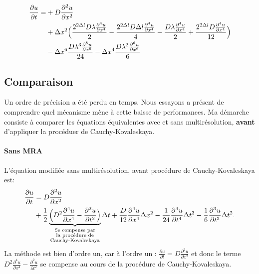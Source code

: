     \begin{align}
        \frac{\partial u}{\partial t}
        =&+ D \frac{\partial^{2}u}{\partial x^{2}}\\\notag
        &+ \Delta x^{2}\Bigl(\frac{2^{2 \Delta l} D  \lambda \frac{\partial^{4}u}{\partial x^{4}}}{2} 
        -  \frac{2^{2 \Delta l} D \Delta l \frac{\partial^{4}u}{\partial x^{4}}}{4} 
        -  \frac{D \lambda \frac{\partial^{4}u}{\partial x^{4}}}{2} 
        +  \frac{2^{2 \Delta l} D\frac{\partial^{4}u}{\partial x^{4}}}{12}\Bigr)\\\notag
        &- \Delta x^{6} \frac{D \lambda^{3} \frac{\partial^{8}u}{\partial x^{8}}}{24} 
        - \Delta x^{4} \frac{D \lambda^{2} \frac{\partial^{6}u}{\partial x^{6}}}{6} 
    \end{align}
\subsection{Comparaison}
    Un ordre de précision a été perdu en temps. Nous essayons a présent de comprendre quel mécanisme mène à cette baisse de performances.
    Ma démarche consiste à comparer les équations équivalentes avec et sans multirésolution, \textbf{avant} d'appliquer la procéduer de Cauchy-Kovaleskaya.
    \paragraph{Sans MRA}
        L'équation modifiée sans multirésolution, avant procédure de Cauchy-Kovaleskaya est:
        \begin{align}
            \frac{\partial u}{\partial t}  &= D \frac{\partial^{2} u}{\partial x^{2}} \\\notag
                &+ \frac{1}{2} \underbrace{\Bigl(D^{2}\frac{\partial^{4} u}{\partial x^{4}} - \frac{\partial^{2} u}{\partial t^{2}} \Bigr)}_{\substack{\text{Se compense par} \\ \text{la procédure de} \\ \text{Cauchy-Kovaleskaya}}} \Delta t
                + \frac{D}{12} \frac{\partial^{4} u}{\partial x^{4}}  \Delta x^{2}
                - \frac{1}{24} \frac{\partial^{4} u}{\partial t^{4}}  \Delta t^{3} 
                - \frac{1}{6}  \frac{\partial^{3} u}{\partial t^{3}}  \Delta t^{2}.
        \end{align}
        La méthode est bien d'ordre un, car à l'ordre un : $\frac{\partial u}{\partial t}  = D \frac{\partial^{2} u}{\partial x^{2}}$ et donc le terme $D^{2}\frac{\partial^{4} u}{\partial x^{4}} - \frac{\partial^{2} u}{\partial t^{2}}$
        se compense au cours de la procédure de Cauchy-Kovaleskaya.
